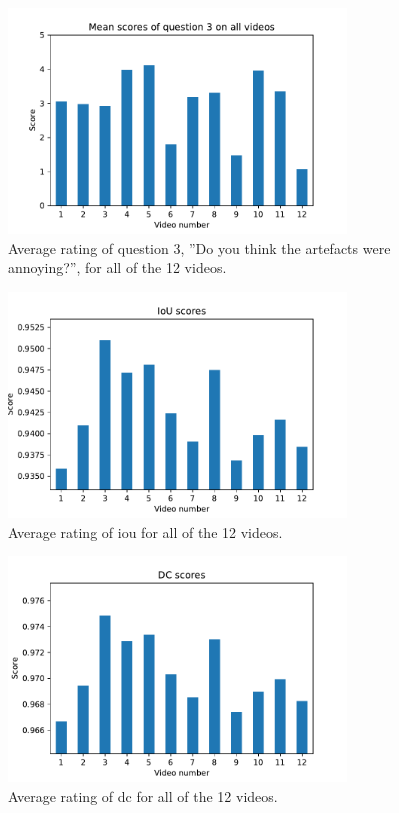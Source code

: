 \begin{figure}[H]
    \centering
    \includegraphics[width=0.8\textwidth]{img/questions/question_3.pdf}
    \caption{Average rating of question 3, ''Do you think the artefacts were annoying?'', for all of the 12 videos.}
    \label{fig:video_rating_q3}
\end{figure}


\begin{figure}[H]
    \centering
    \includegraphics[width=0.8\textwidth]{img/objective_measures/IoU.pdf}
    \caption{Average rating of \acrlong{iou} for all of the 12 videos.}
    \label{fig:video_rating_iou}
\end{figure}

\begin{figure}[H]
    \centering
    \includegraphics[width=0.8\textwidth]{img/objective_measures/DC.pdf}
    \caption{Average rating of \acrlong{dc} for all of the 12 videos.}
    \label{fig:video_rating_dc}
\end{figure}


